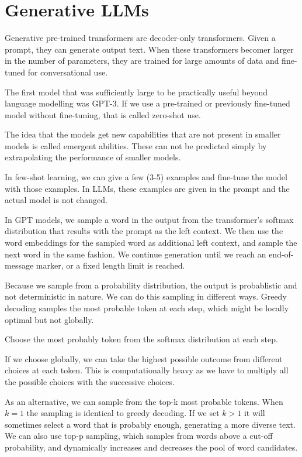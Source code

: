 \section{Generative LLMs}

Generative pre-trained transformers are decoder-only transformers.
Given a prompt, they can generate output text. When these transformers
becomer larger in the number of parameters, they are trained for large amounts
of data and fine-tuned for conversational use.

The first model that was sufficiently large to be practically useful
beyond language
modelling was GPT-3. If we use a pre-trained or previously fine-tuned
model without
fine-tuning, that is called zero-shot use.

The idea that the models get new capabilities that are not present in
smaller models is called emergent abilities. These can not be predicted
simply by extrapolating the performance of smaller models.

In few-shot learning, we can give a few (3-5) examples and fine-tune the
model with those examples. In LLMs, these examples are given in the prompt
and the actual model is not changed.

In GPT models, we sample a word in the output from the transformer's
softmax distribution
that results with the prompt as the left context. We then use the
word embeddings
for the sampled word as additional left context, and sample the next word in the
same fashion. We continue generation until we reach an end-of-message
marker, or a
fixed length limit is reached.

Because we sample from a probability distribution, the output is
probablistic and
not deterministic in nature. We can do this sampling in different
ways. Greedy decoding
samples the most probable token at each step, which might be locally
optimal but not
globally.

\begin{definition}
  Choose the most probably token from the softmax distribution at each step.
\end{definition}

If we choose globally, we can take the highest possible outcome from different
choices at each token. This is computationally heavy as we have to multiply all
the possible choices with the successive choices.

As an alternative, we can sample from the top-k most probable tokens.
When $k = 1$ the
sampling is identical to greedy decoding. If we set $k > 1$ it will
sometimes select
a word that is probably enough, generating a more diverse text. We
can also use top-p sampling,
which samples from words above a cut-off probability, and dynamically
increases and decreases
the pool of word candidates.

